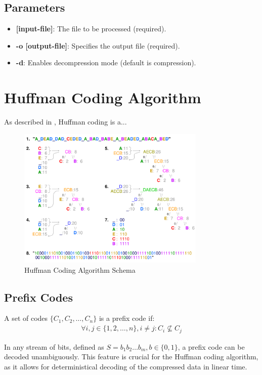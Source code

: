 \documentclass{article}
\begin{document}
\subsection{Parameters}
\begin{itemize}
    \item \textbf{[input-file]}: The file to be processed (required).
    \item \textbf{-o [output-file]}: Specifies the output file (required).
    \item \textbf{-d}: Enables decompression mode (default is compression).
\end{itemize}

\section{Huffman Coding Algorithm}

As described in \cite{wikipedia_huffman}, Huffman coding is a...

\begin{figure}[H]
    \centering
    \includegraphics[width=0.8\textwidth]{schema.png}
    \caption{Huffman Coding Algorithm Schema}
    \label{fig:huffman-schema}
\end{figure}

\subsection{Prefix Codes}

A set of codes $\{C_1, C_2, \ldots, C_n\}$ is a prefix code if:
\begin{align}
    \forall i, j \in \{1, 2, \ldots, n\}, i \neq j: C_i \not\subseteq C_j
\end{align}

\noindent
In any stream of bits, defined as $S = b_1 b_2 \ldots b_m, b\in\{0,1\}$, 
a prefix code can be decoded unambiguously. This feature is crucial for 
the Huffman coding algorithm, as it allows for deterministical decoding
of the compressed data in linear time.
\end{document}
